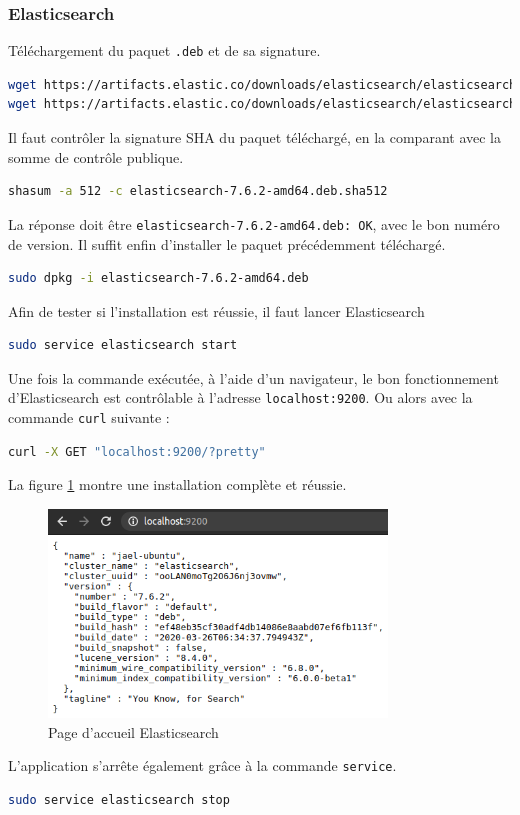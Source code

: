 \documentclass[paper=a4, fontsize=11pt]{scrartcl}
\begin{document}
\subsubsection{Elasticsearch}
Téléchargement du paquet \verb,.deb, et de sa signature.
\begin{lstlisting}[language=bash]
wget https://artifacts.elastic.co/downloads/elasticsearch/elasticsearch-7.6.2-amd64.deb
wget https://artifacts.elastic.co/downloads/elasticsearch/elasticsearch-7.6.2-amd64.deb.sha512
\end{lstlisting}
Il faut contrôler la signature SHA du paquet téléchargé, en la comparant avec la somme de contrôle publique.
\begin{lstlisting}[language=bash]
shasum -a 512 -c elasticsearch-7.6.2-amd64.deb.sha512
\end{lstlisting}
La réponse doit être \verb,elasticsearch-7.6.2-amd64.deb: OK,, avec le bon numéro de version.
Il suffit enfin d'installer le paquet précédemment téléchargé.
\begin{lstlisting}[language=bash]
sudo dpkg -i elasticsearch-7.6.2-amd64.deb
\end{lstlisting}
Afin de tester si l'installation est réussie, il faut lancer Elasticsearch
\begin{lstlisting}[language=bash]
sudo service elasticsearch start
\end{lstlisting}
Une fois la commande exécutée, à l'aide d'un navigateur, le bon fonctionnement d'Elasticsearch est contrôlable à l'adresse \verb,localhost:9200,. Ou alors avec la commande \verb,curl, suivante :
\begin{lstlisting}[language=bash]
curl -X GET "localhost:9200/?pretty"
\end{lstlisting}

La figure \ref{f-elasticsearchInstalled} montre une installation complète et réussie.
\begin{figure}[H]
    \centering
    \includegraphics[width=9cm]{img/screenshots/elasticsearch_installed.png}
    \caption{Page d'accueil Elasticsearch}
    \label{f-elasticsearchInstalled}
\end{figure}
L'application s'arrête également grâce à la commande \verb,service,.
\begin{lstlisting}[language=bash]
sudo service elasticsearch stop
\end{lstlisting}
\end{document}
